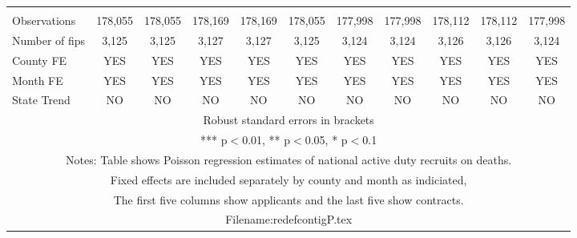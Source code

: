 \documentclass[]{article}
\begin{document}
\begin{tabular}{lcccccccccc}
 &  &  &  &  &  &  &  &  &  &  \\
Observations & 178,055 & 178,055 & 178,169 & 178,169 & 178,055 & 177,998 & 177,998 & 178,112 & 178,112 & 177,998 \\
Number of fips & 3,125 & 3,125 & 3,127 & 3,127 & 3,125 & 3,124 & 3,124 & 3,126 & 3,126 & 3,124 \\
County FE & YES & YES & YES & YES & YES & YES & YES & YES & YES & YES \\
Month FE & YES & YES & YES & YES & YES & YES & YES & YES & YES & YES \\
 State Trend & NO & NO & NO & NO & NO & NO & NO & NO & NO & NO \\ \hline
\multicolumn{11}{c}{ Robust standard errors in brackets} \\
\multicolumn{11}{c}{ *** p$<$0.01, ** p$<$0.05, * p$<$0.1} \\
\multicolumn{11}{c}{ Notes: Table shows Poisson regression estimates of national active duty recruits on deaths.} \\
\multicolumn{11}{c}{ Fixed effects are included separately by county and month as indiciated,} \\
\multicolumn{11}{c}{ The first five columns show applicants and the last five show contracts.} \\
\multicolumn{11}{c}{ Filename:redefcontigP.tex} \\
\end{tabular}
\end{document}
